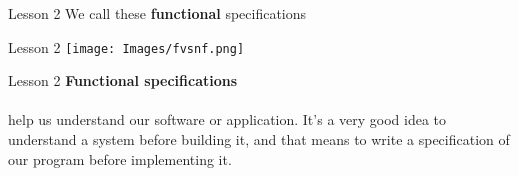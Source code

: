 \documentclass[aspectratio=1610]{beamer}
\begin{document}
\begin{frame}{Lesson 2}{}
\Huge
    We call these \alert{\textbf{functional}} specifications 
\end{frame}

%

\begin{frame}{Lesson 2}{}
\texttt{[image: Images/fvsnf.png]}
\end{frame}




\begin{frame}{Lesson 2}{}
\LARGE
\textbf{Functional specifications}\\~\\
help us understand our software or application. It’s a very good idea to understand a
system before building it, and that means to write a specification of our program
\alert{before} implementing it.
\end{frame}
\end{document}
